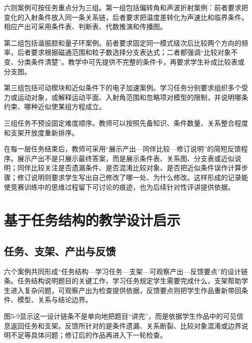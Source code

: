 \documentclass[
  12pt,
  a4paper,twoside,openany]{ctexbook}
\begin{document}
六则案例可按任务重点分为三组。第一组包括偏转角和声波折射案例：前者要求把变化的入射条件放入同一条关系链，后者要求把温度差转化为声速比和临界条件。相应产出可采用条件表、判断表、代数推演和传播图。

第二组包括谐振腔和量子环案例。前者要求固定同一模式级次后比较两个方向的频率，后者要求根据磁通范围和粒子数选择分支表达式；二者都强调``比较对象不变、分类条件清楚''。教学中可先提供不完整的条件卡，再要求学生补成比较表或分支图。

第三组包括可动楔块和近似条件下的电子加速案例。学习任务分别要求组织多个受力或运动对象，或解释运动平面、入射角范围和忽略项对模型的限制，并说明哪条约束、哪种近似使某组方程成立。

三组任务不预设固定难度顺序。教师可以按照先备知识、条件数量、关系整合程度和支架开放度重新排序。

在每一层任务结束后，教师可采用``展示产出---同伴比较---修订说明''的简短反馈程序。展示产出不是只展示最终答案，而是展示条件表、关系图、分支表或近似说明；同伴比较关注是否遗漏条件、是否混淆比较对象、是否把近似条件误作计算步骤；修订说明则要求学生写出自己修改了哪一处、为什么修改。这样形成的记录能使竞赛训练中的思维过程留下可讨论的痕迹，也为后续针对性评讲提供依据。

\section{基于任务结构的教学设计启示}\label{ux57faux4e8eux4efbux52a1ux7ed3ux6784ux7684ux6559ux5b66ux8bbeux8ba1ux542fux793a}

\subsection{任务、支架、产出与反馈}\label{ux4efbux52a1ux652fux67b6ux4ea7ux51faux4e0eux53cdux9988}

六个案例共同形成``任务结构---学习任务---支架---可观察产出---反馈要点''的设计链条。任务结构说明题目的关键工作，学习任务规定学生需要完成什么，支架帮助学生进入复杂问题，可观察产出为检查提供依据，反馈要点则把学生作品重新带回条件、模型、关系与结论边界。

图5-9显示这一设计链条不是单向地把题目``讲完''，而是依据学生作品中的可见信息返回任务和支架。反馈所针对的是条件遗漏、关系断裂、比较对象混淆或边界说明不足等具体问题；修订后的作品再进入下一轮检查。
\end{document}
